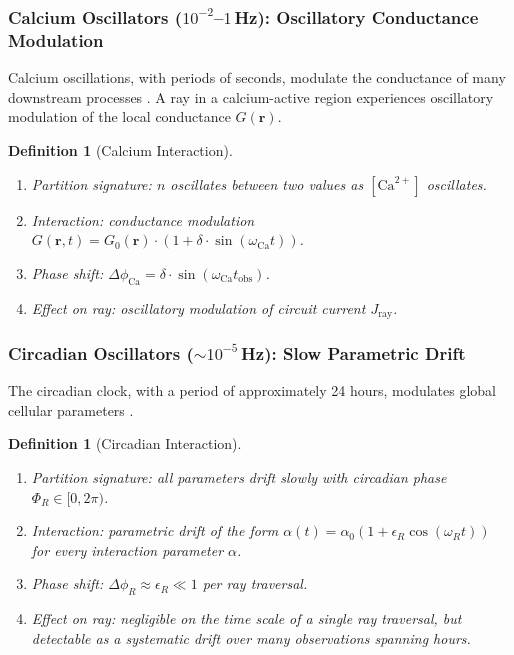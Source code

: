 \documentclass[11pt,twocolumn,a4paper]{article}
\newtheorem{definition}[theorem]{Definition}
\newcommand{\Jray}{J_{\mathrm{ray}}}
\begin{document}
\subsubsection{Calcium Oscillators ($10^{-2}$--$1$\,Hz):
Oscillatory Conductance Modulation}

Calcium oscillations, with periods of seconds, modulate the
conductance of many downstream processes \citep{berridge1998}.
A ray in a calcium-active region experiences oscillatory modulation
of the local conductance $G(\mathbf{r})$.

\begin{definition}[Calcium Interaction]
\label{def:calcium-interaction}
\begin{enumerate}[label=(\alph*),leftmargin=*]
\item \textit{Partition signature:} $n$ oscillates between two values
  as $[\text{Ca}^{2+}]$ oscillates.
\item \textit{Interaction:} conductance modulation
  $G(\mathbf{r}, t) = G_0(\mathbf{r}) \cdot (1 + \delta \cdot
  \sin(\omega_{\mathrm{Ca}} t))$.
\item \textit{Phase shift:}
  $\Delta\phi_{\mathrm{Ca}} = \delta \cdot
  \sin(\omega_{\mathrm{Ca}} t_{\mathrm{obs}})$.
\item \textit{Effect on ray:} oscillatory modulation of circuit
  current $\Jray$.
\end{enumerate}
\end{definition}

\subsubsection{Circadian Oscillators ($\sim\!10^{-5}$\,Hz):
Slow Parametric Drift}

The circadian clock, with a period of approximately 24 hours,
modulates global cellular parameters \citep{reppert2002}.

\begin{definition}[Circadian Interaction]
\label{def:circadian-interaction}
\begin{enumerate}[label=(\alph*),leftmargin=*]
\item \textit{Partition signature:} all parameters drift slowly with
  circadian phase $\Phi_R \in [0, 2\pi)$.
\item \textit{Interaction:} parametric drift of the form
  $\alpha(t) = \alpha_0(1 + \epsilon_R \cos(\omega_R t))$ for every
  interaction parameter $\alpha$.
\item \textit{Phase shift:} $\Delta\phi_R \approx \epsilon_R \ll 1$
  per ray traversal.
\item \textit{Effect on ray:} negligible on the time scale of a single
  ray traversal, but detectable as a systematic drift over many
  observations spanning hours.
\end{enumerate}
\end{definition}
\end{document}
